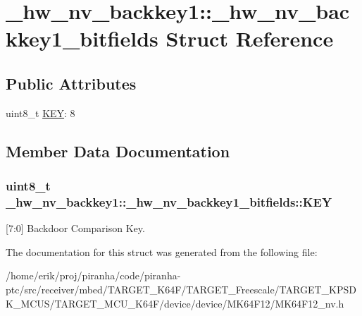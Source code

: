 \hypertarget{struct__hw__nv__backkey1_1_1__hw__nv__backkey1__bitfields}{}\section{\+\_\+hw\+\_\+nv\+\_\+backkey1\+:\+:\+\_\+hw\+\_\+nv\+\_\+backkey1\+\_\+bitfields Struct Reference}
\label{struct__hw__nv__backkey1_1_1__hw__nv__backkey1__bitfields}
\subsection*{Public Attributes}
\begin{DoxyCompactItemize}
\item 
uint8\+\_\+t \hyperlink{struct__hw__nv__backkey1_1_1__hw__nv__backkey1__bitfields_aca91da56a7c888c14d9efd6d43a3de1a}{K\+EY}\+: 8
\end{DoxyCompactItemize}


\subsection{Member Data Documentation}
\subsubsection[{\texorpdfstring{K\+EY}{KEY}}]{\setlength{\rightskip}{0pt plus 5cm}uint8\+\_\+t \+\_\+hw\+\_\+nv\+\_\+backkey1\+::\+\_\+hw\+\_\+nv\+\_\+backkey1\+\_\+bitfields\+::\+K\+EY}\hypertarget{struct__hw__nv__backkey1_1_1__hw__nv__backkey1__bitfields_aca91da56a7c888c14d9efd6d43a3de1a}{}\label{struct__hw__nv__backkey1_1_1__hw__nv__backkey1__bitfields_aca91da56a7c888c14d9efd6d43a3de1a}
\mbox{[}7\+:0\mbox{]} Backdoor Comparison Key. 

The documentation for this struct was generated from the following file\+:\begin{DoxyCompactItemize}
\item 
/home/erik/proj/piranha/code/piranha-\/ptc/src/receiver/mbed/\+T\+A\+R\+G\+E\+T\+\_\+\+K64\+F/\+T\+A\+R\+G\+E\+T\+\_\+\+Freescale/\+T\+A\+R\+G\+E\+T\+\_\+\+K\+P\+S\+D\+K\+\_\+\+M\+C\+U\+S/\+T\+A\+R\+G\+E\+T\+\_\+\+M\+C\+U\+\_\+\+K64\+F/device/device/\+M\+K64\+F12/M\+K64\+F12\+\_\+nv.\+h\end{DoxyCompactItemize}
